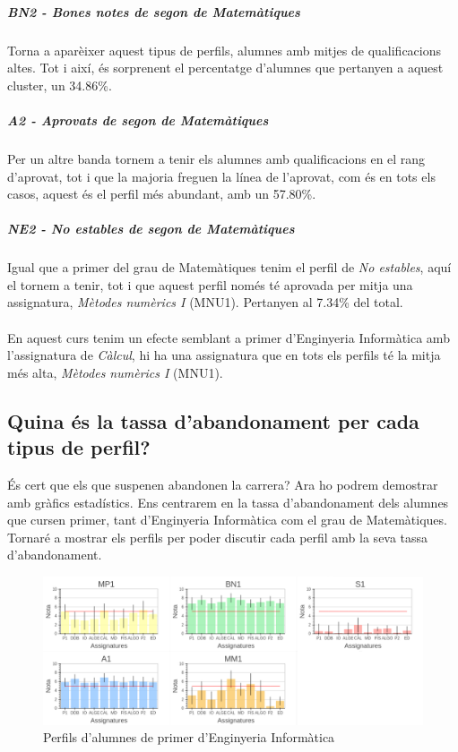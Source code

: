 \documentclass[12pt,a4paper,catalan]{article}
\begin{document}
\newpage

\subparagraph{BN2 - Bones notes de segon de Matemàtiques}
Torna a aparèixer aquest tipus de perfils, alumnes amb mitjes de qualificacions altes. Tot i així, és sorprenent el percentatge d'alumnes que pertanyen a aquest cluster, un 34.86\%.

\subparagraph{A2 - Aprovats de segon de Matemàtiques}
Per un altre banda tornem a tenir els alumnes amb qualificacions en el rang d'aprovat, tot i que la majoria freguen la línea de l'aprovat, com és en tots els casos, aquest és el perfil més abundant, amb un 57.80\%.

\subparagraph{NE2 - No estables de segon de Matemàtiques}
Igual que a primer del grau de Matemàtiques tenim el perfil de \textit{No estables}, aquí el tornem a tenir, tot i que aquest perfil només té aprovada per mitja una assignatura, \textit{Mètodes numèrics I} (MNU1). Pertanyen al 7.34\% del total.
\\
\\
En aquest curs tenim un efecte semblant a primer d'Enginyeria Informàtica amb l'assignatura de \textit{Càlcul}, hi ha una assignatura que en tots els perfils té la mitja més alta, \textit{Mètodes numèrics I} (MNU1).

\newpage

\subsection{Quina és la tassa d'abandonament per cada tipus de perfil?}
És cert que els que suspenen abandonen la carrera? Ara ho podrem demostrar amb gràfics estadístics. Ens centrarem en la tassa d'abandonament dels alumnes que cursen primer, tant d'Enginyeria Informàtica com el grau de Matemàtiques. Tornaré a mostrar els perfils per poder discutir cada perfil amb la seva tassa d'abandonament.

\begin{figure}[h]
\centering
\includegraphics[width=\linewidth]{img/perfils_primer_info.png}
\caption{Perfils d'alumnes de primer d'Enginyeria Informàtica}
\end{figure}
\end{document}
